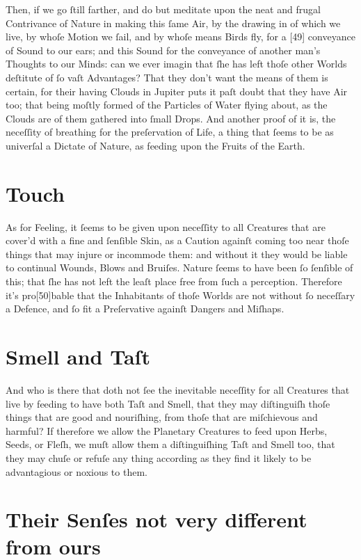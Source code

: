 \documentclass[letterpaper]{book}
\begin{document}
Then, if we go ſtill farther, and do but meditate upon the neat and frugal
Contrivance of Nature in making this ſame Air, by the drawing in of which we
live, by whoſe Motion we ſail, and by whoſe means Birds fly, for a [49]
conveyance of Sound to our ears; and this Sound for the conveyance of
another man's Thoughts to our Minds: can we ever imagin that ſhe has left
thoſe other Worlds deſtitute of ſo vaſt Advantages? That they don't want the
means of them is certain, for their having Clouds in Jupiter puts it paſt
doubt that they have Air too; that being moſtly formed of the Particles of
Water flying about, as the Clouds are of them gathered into ſmall Drops.
And another proof of it is, the neceſſity of breathing for the preſervation
of Life, a thing that ſeems to be as univerſal a Dictate of Nature, as
feeding upon the Fruits of the Earth.


\section{Touch}

As for Feeling, it ſeems to be given upon neceſſity to all Creatures that
are cover'd with a fine and ſenſible Skin, as a Caution againſt coming too
near thoſe things that may injure or incommode them: and without it they
would be liable to continual Wounds, Blows and Bruiſes. Nature ſeems to have
been ſo ſenſible of this; that ſhe has not left the leaſt place free from
ſuch a perception. Therefore it's pro[50]bable that the Inhabitants of thoſe
Worlds are not without ſo neceſſary a Defence, and ſo fit a Preſervative
againſt Dangers and Miſhaps.


\section{Smell and Taſt}

And who is there that doth not ſee the inevitable neceſſity for all Creatures
that live by feeding to have both Taſt and Smell, that they may diſtinguiſh
thoſe things that are good and nouriſhing, from thoſe that are miſchievous
and harmful? If therefore we allow the Planetary Creatures to feed upon
Herbs, Seeds, or Fleſh, we muſt allow them a diſtinguiſhing Taſt and Smell
too, that they may chuſe or refuſe any thing according as they find it likely
to be advantagious or noxious to them.


\section{Their Senſes not very different from ours}
\end{document}
